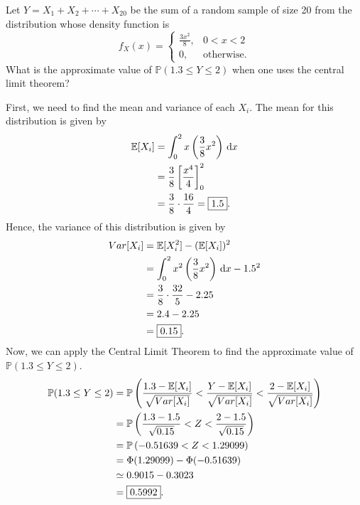 \begin{example}
    Let $Y = X_1 + X_2 + \cdots + X_{20}$ be the sum of a random sample of size 20 
    from the distribution whose density function is
    \[
        f_X(x) = \begin{cases}
            \displaystyle \frac{3x^2}{8}, & 0 < x < 2\\
            0, & \text{otherwise}.
        \end{cases}
    \]
    What is the approximate value of $\mathbb{P}(1.3 \leq Y \leq 2)$ 
    when one uses the central limit theorem?
\end{example}
\begin{solution}
    First, we need to find the mean and variance of each $X_i$. The mean 
    for this distribution is given by
    \begin{align*}
        \mathbb{E}[X_i] &= \int^2_0 x \left( \frac{3}{8}x^2 \right) \, \mathrm{d}x\\
        &= \frac{3}{8} \left[ \frac{x^4}{4} \right]^2_0\\
        &= \frac{3}{8} \cdot \frac{16}{4} = \fbox{$1.5$}.
    \end{align*}
    Hence, the variance of this distribution is given by
    \begin{align*}
        Var[X_i] &= \mathbb{E}[X_i^2] - (\mathbb{E}[X_i])^2\\
        &= \int^2_0 x^2 \left( \frac{3}{8}x^2 \right) \, \mathrm{d}x - 1.5^2\\
        &= \frac{3}{8} \cdot \frac{32}{5} - 2.25\\
        &= 2.4 - 2.25\\
        &= \fbox{$0.15$}.
    \end{align*}
    Now, we can apply the Central Limit Theorem to find the approximate value of 
    $\mathbb{P}(1.3 \leq Y \leq 2)$.
    \begin{align*}
        \mathbb{P}(1.3 \leq Y \leq 2) 
        &= \mathbb{P} \left( \frac{1.3 - \mathbb{E}[X_i]}{\sqrt{Var[X_i]}} < \frac{Y - \mathbb{E}[X_i]}{\sqrt{Var[X_i]}} < \frac{2 - \mathbb{E}[X_i]}{\sqrt{Var[X_i]}} \right)\\
        &= \mathbb{P} \left( \frac{1.3 - 1.5}{\sqrt{0.15}} < Z < \frac{2 - 1.5}{\sqrt{0.15}} \right)\\
        &= \mathbb{P} \left( -0.51639 < Z < 1.29099 \right)\\
        &= \Phi(1.29099) - \Phi(-0.51639)\\
        &\simeq 0.9015 - 0.3023 \\
        &= \fbox{$0.5992$}.
    \end{align*}
\end{solution}

